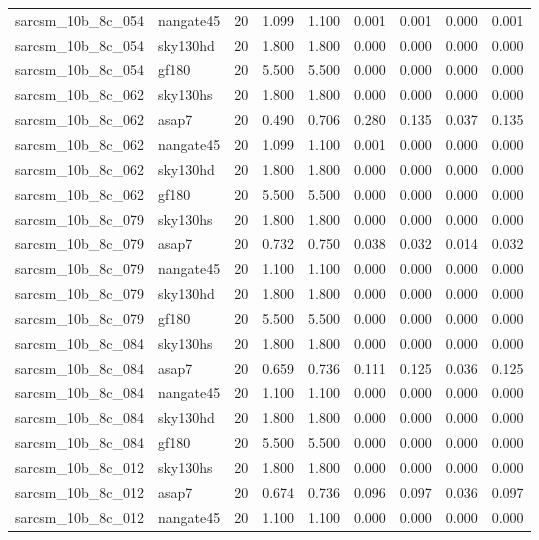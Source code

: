 \begin{tabular}{llrrrrrrr}
sarcsm\_10b\_8c\_054 & nangate45 & 20 & 1.099 & 1.100 & 0.001 & 0.001 & 0.000 & 0.001 \\
sarcsm\_10b\_8c\_054 & sky130hd & 20 & 1.800 & 1.800 & 0.000 & 0.000 & 0.000 & 0.000 \\
sarcsm\_10b\_8c\_054 & gf180 & 20 & 5.500 & 5.500 & 0.000 & 0.000 & 0.000 & 0.000 \\
sarcsm\_10b\_8c\_062 & sky130hs & 20 & 1.800 & 1.800 & 0.000 & 0.000 & 0.000 & 0.000 \\
sarcsm\_10b\_8c\_062 & asap7 & 20 & 0.490 & 0.706 & 0.280 & 0.135 & 0.037 & 0.135 \\
sarcsm\_10b\_8c\_062 & nangate45 & 20 & 1.099 & 1.100 & 0.001 & 0.000 & 0.000 & 0.000 \\
sarcsm\_10b\_8c\_062 & sky130hd & 20 & 1.800 & 1.800 & 0.000 & 0.000 & 0.000 & 0.000 \\
sarcsm\_10b\_8c\_062 & gf180 & 20 & 5.500 & 5.500 & 0.000 & 0.000 & 0.000 & 0.000 \\
sarcsm\_10b\_8c\_079 & sky130hs & 20 & 1.800 & 1.800 & 0.000 & 0.000 & 0.000 & 0.000 \\
sarcsm\_10b\_8c\_079 & asap7 & 20 & 0.732 & 0.750 & 0.038 & 0.032 & 0.014 & 0.032 \\
sarcsm\_10b\_8c\_079 & nangate45 & 20 & 1.100 & 1.100 & 0.000 & 0.000 & 0.000 & 0.000 \\
sarcsm\_10b\_8c\_079 & sky130hd & 20 & 1.800 & 1.800 & 0.000 & 0.000 & 0.000 & 0.000 \\
sarcsm\_10b\_8c\_079 & gf180 & 20 & 5.500 & 5.500 & 0.000 & 0.000 & 0.000 & 0.000 \\
sarcsm\_10b\_8c\_084 & sky130hs & 20 & 1.800 & 1.800 & 0.000 & 0.000 & 0.000 & 0.000 \\
sarcsm\_10b\_8c\_084 & asap7 & 20 & 0.659 & 0.736 & 0.111 & 0.125 & 0.036 & 0.125 \\
sarcsm\_10b\_8c\_084 & nangate45 & 20 & 1.100 & 1.100 & 0.000 & 0.000 & 0.000 & 0.000 \\
sarcsm\_10b\_8c\_084 & sky130hd & 20 & 1.800 & 1.800 & 0.000 & 0.000 & 0.000 & 0.000 \\
sarcsm\_10b\_8c\_084 & gf180 & 20 & 5.500 & 5.500 & 0.000 & 0.000 & 0.000 & 0.000 \\
sarcsm\_10b\_8c\_012 & sky130hs & 20 & 1.800 & 1.800 & 0.000 & 0.000 & 0.000 & 0.000 \\
sarcsm\_10b\_8c\_012 & asap7 & 20 & 0.674 & 0.736 & 0.096 & 0.097 & 0.036 & 0.097 \\
sarcsm\_10b\_8c\_012 & nangate45 & 20 & 1.100 & 1.100 & 0.000 & 0.000 & 0.000 & 0.000 \\

\end{tabular}
